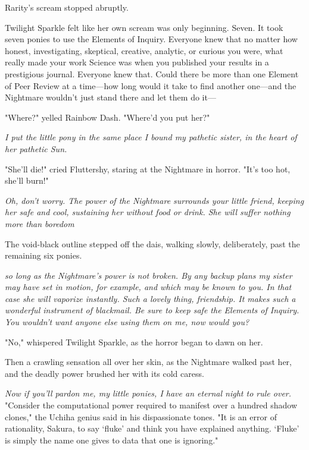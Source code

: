Rarity's scream stopped abruptly.

Twilight Sparkle felt like her own scream was only beginning. Seven. It took
seven ponies to use the Elements of Inquiry. Everyone knew that no matter how
honest, investigating, skeptical, creative, analytic, or curious you were, what
really made your work Science was when you published your results in a
prestigious journal. Everyone knew that. Could there be more than one Element
of Peer Review at a time---how long would it take to find another one---and the
Nightmare wouldn't just stand there and let them do it---

"Where?" yelled Rainbow Dash. "Where'd you put her?"

\emph{I put the little pony in the same place I bound my pathetic sister, in
the heart of her pathetic Sun.}

"She'll die!" cried Fluttershy, staring at the Nightmare in horror. "It's too
hot, she'll burn!"

\emph{Oh, don't worry. The power of the Nightmare surrounds your little friend,
keeping her safe and cool, sustaining her without food or drink. She will
suffer nothing more than boredom{\el}}

The void-black outline stepped off the dais, walking slowly, deliberately, past
the remaining six ponies.

\emph{{\el} so long as the Nightmare's power is not broken. By any backup
plans my sister may have set in motion, for example, and which may be known to
you. In that case she will vaporize instantly. Such a lovely thing, friendship.
It makes such a wonderful instrument of blackmail. Be sure to keep safe the
Elements of Inquiry. You wouldn't want anyone else using them on me, now would
you?}

"No," whispered Twilight Sparkle, as the horror began to dawn on her.

Then a crawling sensation all over her skin, as the Nightmare walked past her,
and the deadly power brushed her with its cold caress.

\emph{Now if you'll pardon me, my little ponies, I have an eternal night to
rule over.}
\sbreak
\newpage
{}
\medskip
"Consider the computational power required to manifest over a hundred shadow
clones," the Uchiha genius said in his dispassionate tones. "It is an error of
rationality, Sakura, to say `fluke' and think you have explained anything.
`Fluke' is simply the name one gives to data that one is ignoring."

